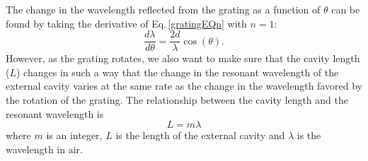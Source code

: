 The change in the wavelength reflected from the grating as a function of $\theta$ can be found by taking the derivative of Eq.\,\ref{gratingEQn} with $n=1$:
\begin{equation}
    \frac{d\lambda}{d \theta}= \frac{2d}{\lambda} \cos(\theta).
\end{equation}
However, as the grating rotates, we also want to make sure that the cavity length ($L$) changes in such a way that the change in the resonant wavelength of the external cavity varies at the same rate as the change in the wavelength favored by the rotation of the grating. The relationship between the cavity length and the resonant wavelength is 
\begin{equation}
L=m\lambda
\end{equation}
where $m$ is an integer, $L$ is the length of the external cavity and $\lambda$ is the wavelength in air.


